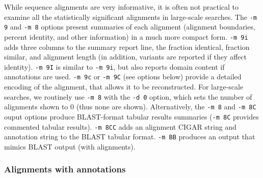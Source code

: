 \documentclass[11pt]{article}
\begin{document}
While sequence alignments are very informative, it is often not
practical to examine all the statistically significant alignments in
large-scale searches. The \texttt{-m 9} and \texttt{-m 8} options
present summaries of each alignment (alignment boundaries, percent
identity, and other information) in a much more compact
form. \texttt{-m 9i} adds three columns to the summary report line,
the fraction identical, fraction similar, and alignment length (in
addition, variants are reported if they affect identity). \texttt{-m
  9I} is similar to \texttt{-m 9i}, but also reports domain content if
annotations are used.  \texttt{-m 9c} or \texttt{-m 9C} (see options
below) provide a detailed encoding of the alignment, that allows it to
be reconstructed. For large-scale searches, we routinely use
\texttt{-m 8} with the \texttt{-d 0} option, which sets the number of
alignments shown to 0 (thus none are shown).  Alternatively, the
\texttt{-m 8} and \texttt{-m 8C} ouput options produce BLAST-format
tabular results summaries (\texttt{-m 8C} provides commented tabular
results).  \texttt{-m 8CC} adds an alignment CIGAR string and
annotation string to the BLAST tabular format.  \texttt{-m BB}
produces an output that mimics BLAST output (with alignments).

\subsubsection{Alignments with annotations}
\end{document}
